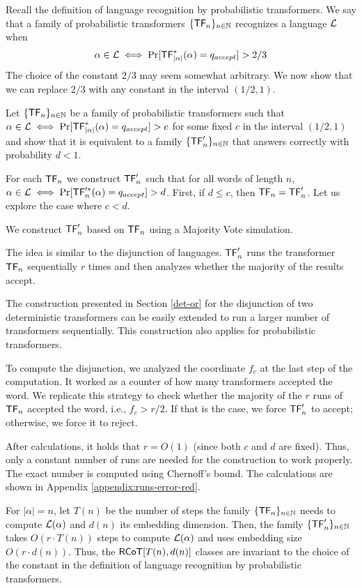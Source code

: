Recall the definition of language recognition by probabilistic transformers. 
We say that a family of probabilistic transformers $\{\mathsf{TF}_n\}_{n \in \mathbb{N}}$ recognizes a language $\mathcal{L}$ when 
\[
    \alpha \in \mathcal{L} \iff \Pr[\mathsf{TF}_{|\alpha|}^*(\alpha) = q_{accept}] > 2/3 
\]
The choice of the constant $2/3$ may seem somewhat arbitrary.
We now show that we can replace $2/3$ with any constant in the interval $(1/2, 1)$.

\bigskip

Let $\{\mathsf{TF}_n\}_{n \in \mathbb{N}}$ be a family of probabilistic transformers such that $\alpha \in \mathcal{L} \iff \Pr[\mathsf{TF}_{|\alpha|}^*(\alpha) = q_{accept}] > c $ for some fixed $c$ in the interval $(1/2, 1)$ and show that it is equivalent to a family $\{\mathsf{TF}'_n\}_{n \in \mathbb{N}}$ that answers correctly with probability $d < 1$.

For each $\mathsf{TF}_n$ we construct $\mathsf{TF}'_n$ such that for all words of length $n$, $\alpha \in \mathcal{L} \iff \Pr[\mathsf{TF}_n'^*(\alpha) = q_{accept}] > d $.
First, if $d \leq c$, then $\mathsf{TF}_n = \mathsf{TF}'_n$.
Let us explore the case where $c < d$.

We construct $\mathsf{TF}'_n$ based on $\mathsf{TF}_n$ using a Majority Vote simulation.

The idea is similar to the disjunction of languages.
$\mathsf{TF}'_n$ runs the transformer $\mathsf{TF}_n$ sequentially $r$ times and then analyzes whether the majority of the results accept.

The construction presented in Section \ref{det-or} for the disjunction of two deterministic transformers can be easily extended to run a larger number of transformers sequentially.
This construction also applies for probabilistic transformers.

To compute the disjunction, we analyzed the coordinate $f_c$ at the last step of the computation.
It worked as a counter of how many transformers accepted the word.
We replicate this strategy to check whether the majority of the $r$ runs of $\mathsf{TF}_n$ accepted the word, i.e., $f_c > r/2$.
If that is the case, we force $\mathsf{TF}'_n$ to accept; otherwise, we force it to reject.


After calculations, it holds that $r = O(1)$ (since both $c$ and $d$ are fixed).
Thus, only a constant number of runs are needed for the construction to work properly.
The exact number is computed using Chernoff's bound.
The calculations are shown in Appendix \ref{appendix:runs-error-red}.


\medskip

For $|\alpha| = n$, let $T(n)$ be the number of steps the family $\{\mathsf{TF}_n\}_{n \in \mathbb{N}}$ needs to compute $\mathcal{L}(\alpha)$ and $d(n)$ its embedding dimension.
Then, the family $\{\mathsf{TF}'_n\}_{n \in \mathbb{N}}$ takes $O(r \cdot T(n))$ steps to compute $\mathcal{L}(\alpha)$ and uses embedding size $O(r \cdot d(n))$.
Thus, the $\mathsf{RCoT}[T(n), d(n)]$ classes are invariant to the choice of the constant in the definition of language recognition by probabilistic transformers.